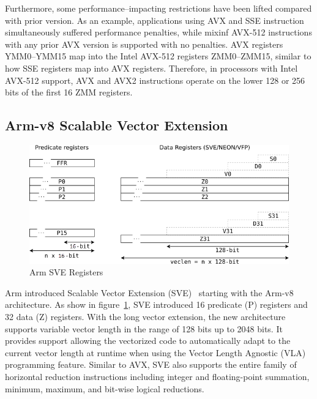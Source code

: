 \documentclass[5p,times,twocolumn]{elsarticle}
\begin{document}
Furthermore, some performance--impacting restrictions have been lifted compared with prior version. As an example, applications using AVX and SSE instruction simultaneously suffered performance penalties, while mixinf AVX-512 instructions with any prior AVX version is supported with no penalties.
%
AVX registers YMM0--YMM15 map into the Intel AVX-512 registers
ZMM0--ZMM15, similar to how SSE registers map into AVX registers. Therefore, in processors with
Intel AVX-512 support, AVX and AVX2 instructions operate on the lower 128 or 256 bits of the first 16 ZMM registers.

\subsection{Arm-v8 Scalable Vector Extension}
\begin{figure}[h]
    \centering
    \includegraphics[width=\linewidth]{armsvereg.png}
    \caption{Arm SVE Registers}
    \label{fig:armsvereg}
\end{figure}
Arm introduced Scalable Vector Extension (SVE)~\cite{armSVE2} starting with the Arm-v8 architecture.
As show in figure~\ref{fig:armsvereg}, SVE introduced 16 predicate (P) registers and 32 data (Z) registers.
With the long vector extension, the new architecture supports variable vector length in the range of 128 bits up to 2048 bits. It provides support allowing the vectorized code to automatically adapt to the
current vector length at runtime when using the Vector
Length Agnostic (VLA) programming feature. Similar to AVX, SVE also supports the entire family of
horizontal reduction instructions including integer and floating-point summation, minimum, maximum,
and bit-wise logical reductions.
\end{document}
